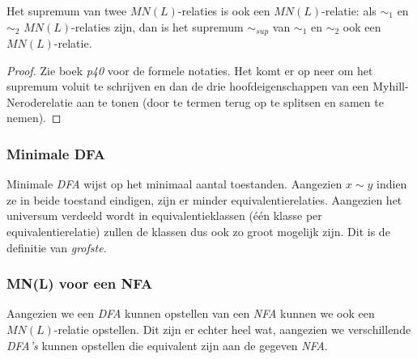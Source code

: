 \begin{theorem}
  Het supremum van twee $MN(L)$-relaties is ook een $MN(L)$-relatie: als $\sim_1$ en $\sim_2$ $MN(L)$-relaties zijn, dan is het supremum $\sim_{sup}$ van $\sim_1$ en $\sim_2$ ook een $MN(L)$-relatie.
\end{theorem}

\begin{proof}
  Zie boek \emph{p40} voor de formele notaties. Het komt er op neer om het supremum voluit te schrijven en dan de drie hoofdeigenschappen van een Myhill-Neroderelatie aan te tonen (door te termen terug op te splitsen en samen te nemen).
\end{proof}

\subsubsection*{Minimale DFA}

Minimale \emph{DFA} wijst op het minimaal aantal toestanden. Aangezien $x \sim y$ indien ze in beide toestand eindigen, zijn er minder equivalentierelaties. Aangezien het universum verdeeld wordt in equivalentieklassen (\'e\'en klasse per equivalentierelatie) zullen de klassen dus ook zo groot mogelijk zijn. Dit is de definitie van \emph{grofste}.

\subsubsection*{MN(L) voor een NFA}

Aangezien we een \emph{DFA} kunnen opstellen van een \emph{NFA} kunnen we ook een $MN(L)$-relatie opstellen. Dit zijn er echter heel wat, aangezien we verschillende \emph{DFA's} kunnen opstellen die equivalent zijn aan de gegeven \emph{NFA}.
